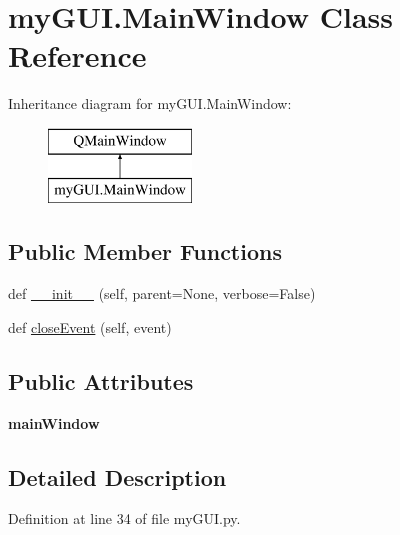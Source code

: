 \hypertarget{classmy_g_u_i_1_1_main_window}{}\section{my\+G\+U\+I.\+Main\+Window Class Reference}
\label{classmy_g_u_i_1_1_main_window}
Inheritance diagram for my\+G\+U\+I.\+Main\+Window\+:\begin{figure}[H]
\begin{center}
\leavevmode
\includegraphics[height=2.000000cm]{classmy_g_u_i_1_1_main_window}
\end{center}
\end{figure}
\subsection*{Public Member Functions}
\begin{DoxyCompactItemize}
\item 
def \hyperlink{classmy_g_u_i_1_1_main_window_ae1384cb303efcddcfc5369add82fcca6}{\+\_\+\+\_\+init\+\_\+\+\_\+} (self, parent=None, verbose=False)
\item 
def \hyperlink{classmy_g_u_i_1_1_main_window_ad113a3a66d24e2ab4c853d8b7d18cb90}{close\+Event} (self, event)
\end{DoxyCompactItemize}
\subsection*{Public Attributes}
\begin{DoxyCompactItemize}
\item 
{\bfseries main\+Window}\hypertarget{classmy_g_u_i_1_1_main_window_a75eef46e24389628f713b73b4566fa2a}{}\label{classmy_g_u_i_1_1_main_window_a75eef46e24389628f713b73b4566fa2a}

\end{DoxyCompactItemize}


\subsection{Detailed Description}


Definition at line 34 of file my\+G\+U\+I.\+py.



